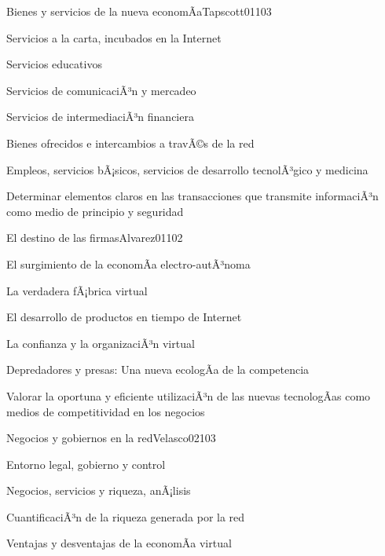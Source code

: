 \begin{syllabus}
\begin{unit}{Bienes y servicios de la nueva economÃ­a}{Tapscott01}{10}{3}
   \begin{topics}
      \item Servicios a la carta, incubados en la Internet
	\item Servicios educativos
	\item Servicios de comunicaciÃ³n y mercadeo
	\item Servicios de intermediaciÃ³n financiera
	\item Bienes ofrecidos e intercambios a travÃ©s de la red
	\item Empleos, servicios bÃ¡sicos, servicios de desarrollo tecnolÃ³gico y medicina
   \end{topics}

   \begin{unitgoals}
      \item Determinar elementos claros en las transacciones que transmite informaciÃ³n como medio de principio y seguridad
   \end{unitgoals}
\end{unit}

\begin{unit}{El destino de las firmas}{Alvarez01}{10}{2}
   \begin{topics}
      \item El surgimiento de la economÃ­a electro-autÃ³noma
	\item La verdadera fÃ¡brica virtual
	\item El desarrollo de productos en tiempo de Internet
	\item La confianza y la organizaciÃ³n virtual
	\item Depredadores y presas: Una nueva ecologÃ­a de la competencia
   \end{topics}

   \begin{unitgoals}
      \item Valorar la oportuna y eficiente utilizaciÃ³n de las nuevas tecnologÃ­as como medios de competitividad en los negocios
   \end{unitgoals}
\end{unit}

\begin{unit}{Negocios y gobiernos en la red}{Velasco02}{10}{3}
   \begin{topics}
      \item Entorno legal, gobierno y control
	\item Negocios, servicios y riqueza, anÃ¡lisis
	\item CuantificaciÃ³n de la riqueza generada por la red
	\item Ventajas y desventajas de la economÃ­a virtual
   \end{topics}


\end{unit}
\end{syllabus}
